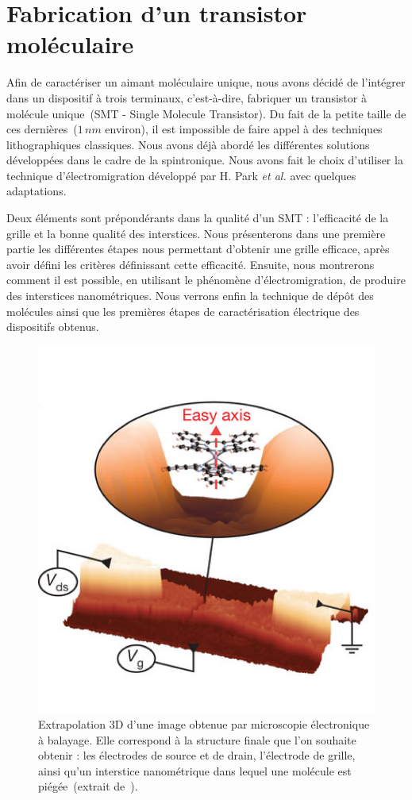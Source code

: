 \chapter{Fabrication d'un transistor moléculaire}
Afin de caractériser un aimant moléculaire unique, nous avons décidé de l'intégrer dans un dispositif à trois terminaux, c'est-à-dire, fabriquer un transistor à molécule unique~(SMT - Single Molecule Transistor). Du fait de la petite taille de ces dernières~($1\,nm$ environ), il est impossible de faire appel à des techniques lithographiques classiques. Nous avons déjà abordé les différentes solutions développées dans le cadre de la spintronique. Nous avons fait le choix d'utiliser la technique d'électromigration développé par H. Park \textit{et al.} avec quelques adaptations.

Deux éléments sont prépondérants dans la qualité d'un SMT : l’efficacité de la grille et la bonne qualité des interstices. Nous présenterons dans une première partie les différentes étapes nous permettant d'obtenir une grille efficace, après avoir défini les critères définissant cette efficacité. Ensuite, nous montrerons comment il est possible, en utilisant le phénomène d'électromigration, de produire des interstices nanométriques. Nous verrons enfin la technique de dépôt des molécules ainsi que les premières étapes de caractérisation électrique des dispositifs obtenus.


\begin{figure}
\parbox{6.5cm}{
\includegraphics[scale=0.45]{Fabrication/ImageTrans/ImageTrans.pdf} 
}
\parbox{7cm}{\caption{Extrapolation 3D d'une image obtenue par microscopie électronique à balayage. Elle correspond à la structure finale que l'on souhaite obtenir : les électrodes de source et de drain, l'électrode de grille, ainsi qu'un interstice nanométrique dans lequel une molécule est piégée~(extrait de~\cite{Vincent2012}).}
\label{ImageTrans}
}
\end{figure}

